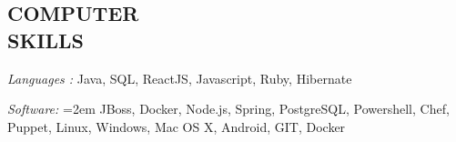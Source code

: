 \documentclass[12pt, line, margin]{res}
\begin{document}

\address{
}

\begin{resume}


\section{COMPUTER \\ SKILLS} {\sl Languages :} Java, SQL, ReactJS, Javascript, Ruby, Hibernate

               {\sl Software:}  
			\hangindent=2em
			JBoss, Docker, Node.js, Spring, PostgreSQL, Powershell, \newline 
			Chef, Puppet, Linux, Windows, Mac OS X, Android, GIT, Docker
			

\end{resume}
\end{document}
